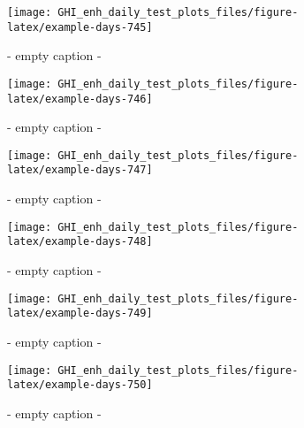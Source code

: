 \documentclass[
  10pt,
  a4paper,oneside]{article}
\begin{document}
\begin{figure}[H]

{\centering \texttt{[image: GHI\_enh\_daily\_test\_plots\_files/figure-latex/example-days-745]} 

}

\caption{ - empty caption - }\label{fig:example-days-745}
\end{figure}

\begin{figure}[H]

{\centering \texttt{[image: GHI\_enh\_daily\_test\_plots\_files/figure-latex/example-days-746]} 

}

\caption{ - empty caption - }\label{fig:example-days-746}
\end{figure}

\begin{figure}[H]

{\centering \texttt{[image: GHI\_enh\_daily\_test\_plots\_files/figure-latex/example-days-747]} 

}

\caption{ - empty caption - }\label{fig:example-days-747}
\end{figure}

\begin{figure}[H]

{\centering \texttt{[image: GHI\_enh\_daily\_test\_plots\_files/figure-latex/example-days-748]} 

}

\caption{ - empty caption - }\label{fig:example-days-748}
\end{figure}

\begin{figure}[H]

{\centering \texttt{[image: GHI\_enh\_daily\_test\_plots\_files/figure-latex/example-days-749]} 

}

\caption{ - empty caption - }\label{fig:example-days-749}
\end{figure}

\begin{figure}[H]

{\centering \texttt{[image: GHI\_enh\_daily\_test\_plots\_files/figure-latex/example-days-750]} 

}

\caption{ - empty caption - }\label{fig:example-days-750}
\end{figure}
\end{document}
